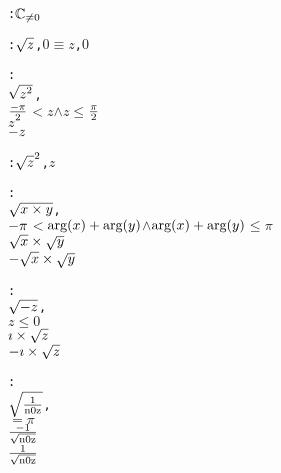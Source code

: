 \begin{alltt}
  :  \pvsid{(}\pvsid{)}  \({\pvssubscript{\mathbb{C}}{{\not=}0}}\)\vspace*{\pvsdeclspacing}

  :  \pvsid{(}\(\sqrtonefn{z}\), \(0\)\pvsid{)} \(\equiv\) \pvsid{(}\(z\), \(0\)\pvsid{)}\vspace*{\pvsdeclspacing}

  : 
    \pvsid{(}\(\sqrtonefn{\sqonefn{z}}\),
           \(\opdividetwofn{\opdifferenceonefn{\pi}}{2}\) \(<\) \pvsid{(}\(z\)\pvsid{)} \(\wedge\) \pvsid{(}\(z\)\pvsid{)} \(\leq\) \(\opdividetwofn{\pi}{2}\)
             \(z\)
           \(\opdifferenceonefn{z}\)
          \pvsid{)}\vspace*{\pvsdeclspacing}

  :  \pvsid{(}\(\sqonefn{\sqrtonefn{z}}\), \(z\)\pvsid{)}\vspace*{\pvsdeclspacing}

  : 
    \pvsid{(}\(\sqrtonefn{\optimestwofn{x}{y}}\),
           \(\opdifferenceonefn{\pi}\) \(<\) \(\opplustwofn{\pvsid{arg}\pvsid{(}x\pvsid{)}}{\pvsid{arg}\pvsid{(}y\pvsid{)}}\) \(\wedge\) \(\opplustwofn{\pvsid{arg}\pvsid{(}x\pvsid{)}}{\pvsid{arg}\pvsid{(}y\pvsid{)}}\) \(\leq\) \(\pi\)
             \(\optimestwofn{\sqrtonefn{x}}{\sqrtonefn{y}}\)
           \(\optimestwofn{\opdifferenceonefn{\sqrtonefn{x}}}{\sqrtonefn{y}}\)
          \pvsid{)}\vspace*{\pvsdeclspacing}

  : 
    \pvsid{(}\(\sqrtonefn{\opdifferenceonefn{z}}\),
           \pvsid{(}\(z\)\pvsid{)} \(\leq\) \(0\)
             \(\optimestwofn{{\imath}}{\sqrtonefn{z}}\)
           \(\optimestwofn{\opdifferenceonefn{{\imath}}}{\sqrtonefn{z}}\)
          \pvsid{)}\vspace*{\pvsdeclspacing}

  : 
    \pvsid{(}\(\sqrtonefn{\opdividetwofn{1}{\pvsid{n0z}}}\),
           \pvsid{(}\pvsid{)} \(=\) \(\pi\)
             \(\opdividetwofn{\opdifferenceonefn{1}}{\sqrtonefn{\pvsid{n0z}}}\)
           \(\opdividetwofn{1}{\sqrtonefn{\pvsid{n0z}}}\)
          \pvsid{)}\vspace*{\pvsdeclspacing}


\end{alltt}

